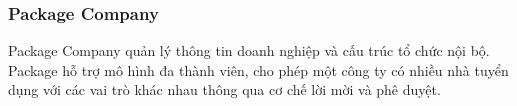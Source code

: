 %
%
%
%
%

\subsubsection{Package Company}

Package Company quản lý thông tin doanh nghiệp và cấu trúc tổ chức nội bộ. Package hỗ trợ mô hình đa thành viên, cho phép một công ty có nhiều nhà tuyển dụng với các vai trò khác nhau thông qua cơ chế lời mời và phê duyệt.

%
%
%
%
%

